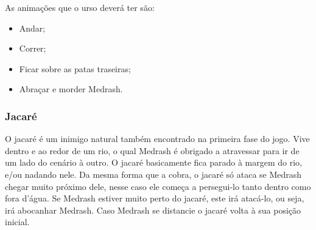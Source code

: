 \begin{itemize}
As animações que o urso deverá ter são:
\begin{itemize}
\item Andar;
\item Correr;
\item Ficar sobre as patas traseiras;
\item Abraçar e morder Medrash.
\end{itemize}
\end{itemize}

\subsubsection{Jacaré}
O jacaré é um inimigo natural também encontrado na primeira fase do jogo.
 Vive dentro e ao redor de um rio, o qual Medrash é obrigado a atravessar para ir de
 um lado do cenário à outro. O jacaré basicamente fica parado à margem do rio, e/ou
 nadando nele. Da mesma forma que a cobra, o jacaré só ataca se Medrash
 chegar muito próximo dele, nesse caso ele começa a persegui-lo tanto
 dentro como fora d'água. Se Medrash estiver muito perto do jacaré, este
 irá atacá-lo, ou seja, irá abocanhar Medrash. Caso Medrash se distancie o
 jacaré volta à sua posição inicial.
